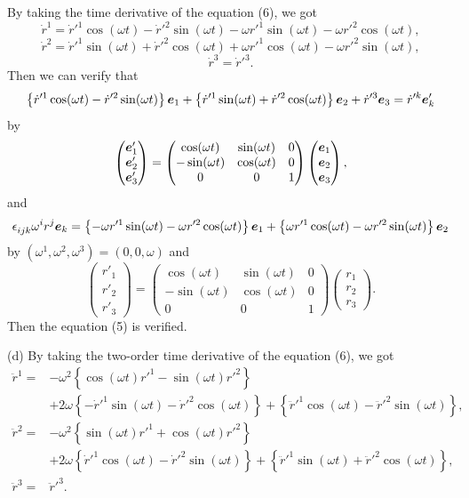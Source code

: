 \documentclass{article}
\begin{document}
\begin{solution}
By taking the time derivative of the equation (6), we got
\[ \dot{r}^1=\dot{r}'^1\cos(\omega t)-\dot{r}'^2\sin(\omega t)-\omega r'^1\sin(\omega t)-\omega r'^2\cos(\omega t), \]
\[ \dot{r}^2=\dot{r}'^1\sin(\omega t)+\dot{r}'^2\cos(\omega t)+\omega r'^1\cos(\omega t)-\omega r'^2\sin(\omega t), \]
\[ \dot{r}^3=\dot{r}'^3. \]
Then we can verify that
\[ \left\{\dot{r}'^1\cos(\omega t)-\dot{r}'^2\sin(\omega t)\right\}\boldsymbol{e}_1 +\left\{\dot{r}'^1\sin(\omega t)+\dot{r}'^2\cos(\omega t)\right\}\boldsymbol{e}_2 +\dot{r}'^3\boldsymbol{e}_3=\dot{r}^{\prime k}\boldsymbol{e}_k' \]
by
\[ \left(\begin{matrix}
\boldsymbol{e}_1'\\ \boldsymbol{e}_2' \\ \boldsymbol{e}_3'
\end{matrix}\right)
=\left(\begin{matrix}
\cos(\omega t) & \sin(\omega t) & 0\\
-\sin(\omega t) & \cos(\omega t) & 0\\
0 & 0 & 1
\end{matrix}\right)\left(\begin{matrix}
\boldsymbol{e}_1\\ \boldsymbol{e}_2 \\ \boldsymbol{e}_3
\end{matrix}\right), \]
and \[ \epsilon\indices{_{ijk}}\omega^i r^j\bo{e}_k=\left\{-\omega r'^1\sin(\omega t)-\omega r'^2\cos(\omega t)\right\}\bo{e}_1 +\left\{\omega r'^1\cos(\omega t)-\omega r'^2\sin(\omega t)\right\}\bo{e}_2 \]
by $ (\omega^1,\omega^2,\omega^3) = (0,0,\omega) $ and 
\[ \left(\begin{matrix}
r'_1\\r'_2\\r'_3
\end{matrix}\right)
=\left(\begin{matrix}
\cos(\omega t) & \sin(\omega t) & 0\\
-\sin(\omega t) & \cos(\omega t) & 0\\
0 & 0 & 1
\end{matrix}\right)\left(\begin{matrix}
r_1\\r_2\\r_3
\end{matrix}\right).\] 
Then the equation (5) is verified.

(d) By taking the two-order time derivative of the equation (6), we got
\begin{align*}
\ddot{r}^1=&-\omega^2\left\{\cos(\omega t)r'^1-\sin(\omega t)r'^2\right\}\\
&+2\omega\left\{-\dot{r}'^1\sin(\omega t)-\dot{r}'^2\cos(\omega t)\right\}
+\left\{\ddot{r}'^1\cos(\omega t)-\ddot{r}'^2\sin(\omega t)\right\},\\
\ddot{r}^2=&-\omega^2\left\{\sin(\omega t)r'^1+\cos(\omega t)r'^2\right\}\\
&+2\omega\left\{\dot{r}'^1\cos(\omega t)-\dot{r}'^2\sin(\omega t)\right\}
+\left\{\ddot{r}'^1\sin(\omega t)+\ddot{r}'^2\cos(\omega t)\right\},\\
\ddot{r}^3=&\ddot{r}'^3.
\end{align*}


\end{solution}
\end{document}
